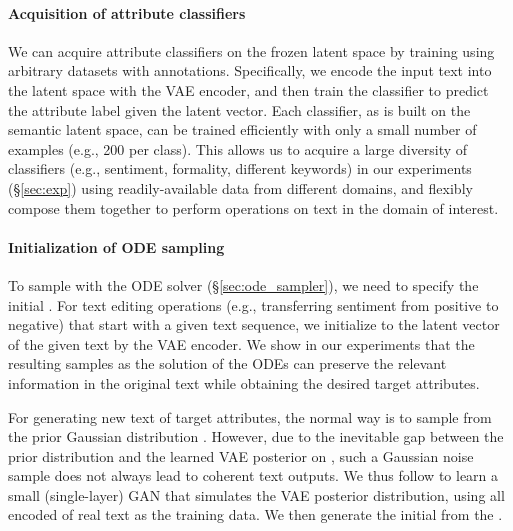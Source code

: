 \documentclass[11pt]{article}
\begin{document}
\paragraph{Acquisition of attribute classifiers}
We can acquire attribute classifiers  on the frozen latent space by training using arbitrary datasets with annotations. Specifically, we encode the input text into the latent space with the VAE encoder, and then train the classifier to predict the attribute label given the latent vector. Each classifier, as is built on the semantic latent space, can be trained efficiently with only a small number of examples (e.g., 200 per class). This allows us to acquire a large diversity of classifiers (e.g., sentiment, formality, different keywords) in our experiments (\S\ref{sec:exp}) using readily-available data from different domains, and flexibly compose them together to perform operations on text in the domain of interest. 


\paragraph{Initialization of ODE sampling}

To sample  with the ODE solver (\S\ref{sec:ode_sampler}), we need to specify the initial . For text editing operations (e.g., transferring sentiment from positive to negative) that start with a given text sequence, we initialize  to the latent vector of the given text by the VAE encoder. We show in our experiments that the resulting  samples as the solution of the ODEs can preserve the relevant information in the original text while obtaining the desired target attributes.

For generating new text of target attributes, the normal way is to sample  from the prior Gaussian distribution . However, due to the inevitable gap between the prior distribution and the learned VAE posterior on , such a Gaussian noise sample does not always lead to coherent text outputs. We thus follow \citep{li-etal-2020-optimus,hu2021causal} to learn a small (single-layer) GAN \citep{goodfellow2014generative}  that simulates the VAE posterior distribution, using all encoded  of real text as the training data. We then generate the initial  from the .
\end{document}
